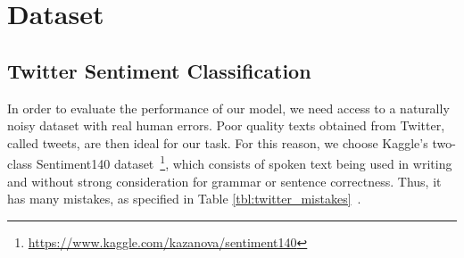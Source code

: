 \documentclass[review]{elsarticle}
\begin{document}
\section{Dataset}
\label{sec:dataset}

\subsection{Twitter Sentiment Classification}
In order to evaluate the performance of our model, we need access to a naturally noisy dataset with real human errors. Poor quality texts obtained from Twitter, called tweets, are then ideal for our task. For this reason, we choose Kaggle's two-class Sentiment140 dataset~\cite{go2009twitterSentiment140}\footnote{\url{https://www.kaggle.com/kazanova/sentiment140}}, which consists of spoken text being used in writing and without strong consideration for grammar or sentence correctness. Thus, it has many mistakes, as specified in Table \ref{tbl:twitter_mistakes}~\cite{lourentzou2019adapting}.

\begin{table}[ht!]
  \caption{Types of mistakes on the Twitter dataset.}
  \label{tbl:twitter_mistakes}
  \bigskip
  \centering
\end{table}
\end{document}
